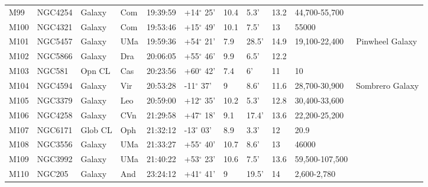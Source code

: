 \documentclass[10pt,twoside,a4paper,english]{article}
\begin{document}
\begin{longtable}{@{}lllllllllll@{}}
M99        & NGC4254     & Galaxy     & Com       & 19:39:59 & +14$^{\circ}$ 25'  & 10.4      & 5.3'                 & 13.2     & 44,700-55,700       &                                           \\ 
M100       & NGC4321     & Galaxy     & Com       & 19:53:46 & +15$^{\circ}$ 49'  & 10.1      & 7.5'                 & 13       & 55000               &                                           \\ 
M101       & NGC5457     & Galaxy     & UMa       & 19:59:36 & +54$^{\circ}$ 21'  & 7.9       & 28.5'                & 14.9     & 19,100-22,400       & Pinwheel Galaxy                           \\ 
M102       & NGC5866     & Galaxy     & Dra       & 20:06:05 & +55$^{\circ}$ 46'  & 9.9       & 6.5'                 & 12.2     &                     &                                           \\ 
M103       & NGC581      & Opn CL     & Cas       & 20:23:56 & +60$^{\circ}$ 42'  & 7.4       & 6'                   & 11       & 10                  &                                           \\ 
M104       & NGC4594     & Galaxy     & Vir       & 20:53:28 & -11$^{\circ}$ 37'  & 9         & 8.6'                 & 11.6     & 28,700-30,900       & Sombrero Galaxy                           \\ 
M105       & NGC3379     & Galaxy     & Leo       & 20:59:00 & +12$^{\circ}$ 35'  & 10.2      & 5.3'                 & 12.8     & 30,400-33,600       &                                           \\ 
M106       & NGC4258     & Galaxy     & CVn       & 21:29:58 & +47$^{\circ}$ 18'  & 9.1       & 17.4'                & 13.6     & 22,200-25,200       &                                           \\ 
M107       & NGC6171     & Glob CL    & Oph       & 21:32:12 & -13$^{\circ}$ 03'  & 8.9       & 3.3'                 & 12       & 20.9                &                                           \\ 
M108       & NGC3556     & Galaxy     & UMa       & 21:33:27 & +55$^{\circ}$ 40'  & 10.7      & 8.6'                 & 13       & 46000               &                                           \\ 
M109       & NGC3992     & Galaxy     & UMa       & 21:40:22 & +53$^{\circ}$ 23'  & 10.6      & 7.5'                 & 13.6     & 59,500-107,500      &                                           \\ 
M110       & NGC205      & Galaxy     & And       & 23:24:12 & +41$^{\circ}$ 41'  & 9         & 19.5'                & 14       & 2,600-2,780         &                                           \\ 
\hline 
\end{longtable} 
 
\end{document}
